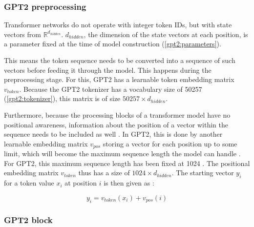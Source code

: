 \subsubsection{GPT2 preprocessing}
\label{gpt2_preproc}


Transformer networks do not operate with integer token IDs, but with state vectors from $\mathbb{R}^{d_{hidden}}$. $d_{hidden}$, the dimension of the state vectors at each position, is a parameter fixed at the time of model construction (\ref{gpt2:parameters}).

This means the token sequence needs to be converted into a sequence of such vectors before feeding it through the model. This happens during the preprocessing stage.
For this, GPT2 has a learnable token embedding matrix $v_{token}$.  Because the GPT2 tokenizer has a vocabulary size of 50257 (\ref{gpt2:tokenizer}), this matrix is of size $50257 \times d_{hidden}$.

\begin{samepage}

Furthermore, because the processing blocks of a transformer model have no positional awareness, information about the position of a vector within the sequence needs to be included as well .
In GPT2, this is done by another learnable embedding matrix $v_{pos}$ storing a vector for each position up to some limit, which will become the maximum sequence length the model can handle   . For GPT2, this maximum sequence length has been fixed at 1024  \cite{HuggingFaceGPT2}.
The positional embedding matrix $v_{token}$ thus has a size of $1024 \times d_{hidden}$.
The starting vector $y_i$ for a token value $x_i$ at position $i$ is then given as :

$$y_i = v_{token}(x_i) + v_{pos}(i)$$

\end{samepage}


\subsubsection{GPT2 block}


